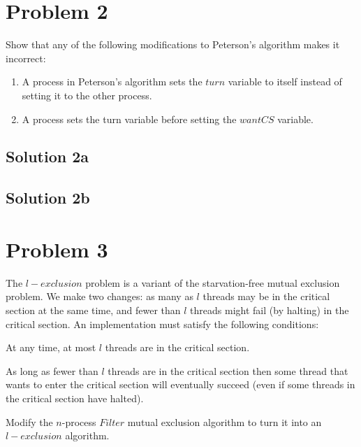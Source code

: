\documentclass{article}
\begin{document}
\pagebreak
\section{Problem 2}
Show that any of the following modifications to Peterson’s algorithm makes it incorrect:

\begin{enumerate}[label=\alph*)]
  \item A process in Peterson’s algorithm sets the $turn$ variable to itself instead of setting it to the other process.
  \item A process sets the turn variable before setting the $wantCS$ variable.
\end{enumerate}


\subsection{Solution 2a}

\subsection{Solution 2b}


\pagebreak
\section{Problem 3}
The $l-exclusion$ problem is a variant of the starvation-free mutual exclusion problem. We make two changes: as many as $l$ threads may be in the critical section at the same time, and fewer than $l$ threads might fail (by halting) in the critical section. An implementation must satisfy the following conditions:

\begin{description}[font=\scshape\bfseries]
\item [$l-Exclusion$:] At any time, at most $l$ threads are in the critical section.
\item [$l-Starvation-Freedom$:] As long as fewer than $l$ threads are in the critical section then some thread that wants to enter the critical section will eventually succeed (even if some threads in the critical section have halted).
\end{description}

Modify the $n$-process $Filter$ mutual exclusion algorithm to turn it into an $l-exclusion$ algorithm.
\end{document}
